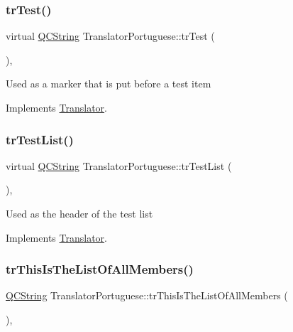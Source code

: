 \subsubsection{\texorpdfstring{trTest()}{trTest()}}
{\footnotesize\ttfamily virtual \mbox{\hyperlink{class_q_c_string}{Q\+C\+String}} Translator\+Portuguese\+::tr\+Test (\begin{DoxyParamCaption}{ }\end{DoxyParamCaption})\hspace{0.3cm}{\ttfamily [inline]}, {\ttfamily [virtual]}}

Used as a marker that is put before a test item 

Implements \mbox{\hyperlink{class_translator}{Translator}}.

\mbox{\label{class_translator_portuguese_a048a57f10f6013df5d100887c05c5182}} 
\subsubsection{\texorpdfstring{trTestList()}{trTestList()}}
{\footnotesize\ttfamily virtual \mbox{\hyperlink{class_q_c_string}{Q\+C\+String}} Translator\+Portuguese\+::tr\+Test\+List (\begin{DoxyParamCaption}{ }\end{DoxyParamCaption})\hspace{0.3cm}{\ttfamily [inline]}, {\ttfamily [virtual]}}

Used as the header of the test list 

Implements \mbox{\hyperlink{class_translator}{Translator}}.

\mbox{\label{class_translator_portuguese_a7a533c992336185a6513bbdd8217c202}} 
\subsubsection{\texorpdfstring{trThisIsTheListOfAllMembers()}{trThisIsTheListOfAllMembers()}}
{\footnotesize\ttfamily \mbox{\hyperlink{class_q_c_string}{Q\+C\+String}} Translator\+Portuguese\+::tr\+This\+Is\+The\+List\+Of\+All\+Members (\begin{DoxyParamCaption}{ }\end{DoxyParamCaption})\hspace{0.3cm}{\ttfamily [inline]}, {\ttfamily [virtual]}}

